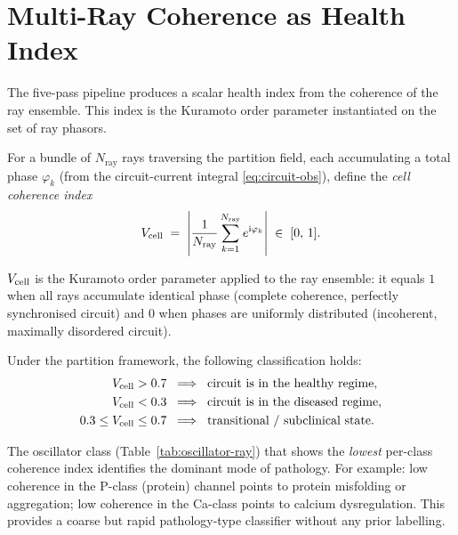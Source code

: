 \section{Multi-Ray Coherence as Health Index}
\label{sec:multi-ray}

The five-pass pipeline produces a scalar health index from the coherence of
the ray ensemble.  This index is the Kuramoto order parameter instantiated on
the set of ray phasors.

\begin{definition}
\label{def:vcell}
For a bundle of $N_{\mathrm{ray}}$ rays traversing the partition field, each
accumulating a total phase $\varphi_k$ (from the circuit-current integral
\eqref{eq:circuit-obs}), define the \emph{cell coherence index}
\begin{equation}
  V_{\mathrm{cell}} \;=\; \left|\frac{1}{N_{\mathrm{ray}}}
    \sum_{k=1}^{N_{\mathrm{ray}}} e^{\mathrm{i}\varphi_k}\right|
  \;\in\; [0,\,1].
  \label{eq:vcell}
\end{equation}
\end{definition}

$V_{\mathrm{cell}}$ is the Kuramoto order parameter \citep{Kuramoto1984} applied to the
ray ensemble: it equals $1$ when all rays accumulate identical phase (complete
coherence, perfectly synchronised circuit) and $0$ when phases are uniformly
distributed (incoherent, maximally disordered circuit).

\begin{proposition}
\label{prop:vcell-threshold}
Under the partition framework, the following classification holds:
\begin{align}
  V_{\mathrm{cell}} > 0.7 &\;\implies\; \text{circuit is in the healthy regime},\\
  V_{\mathrm{cell}} < 0.3 &\;\implies\; \text{circuit is in the diseased regime},\\
  0.3 \leq V_{\mathrm{cell}} \leq 0.7 &\;\implies\; \text{transitional / subclinical state}.
\end{align}
\end{proposition}

\begin{remark}
The oscillator class (Table~\ref{tab:oscillator-ray}) that shows the \emph{lowest}
per-class coherence index identifies the dominant mode of pathology.  For
example: low coherence in the P-class (protein) channel points to protein
misfolding or aggregation; low coherence in the Ca-class points to calcium
dysregulation.  This provides a coarse but rapid pathology-type classifier
without any prior labelling.
\end{remark}

